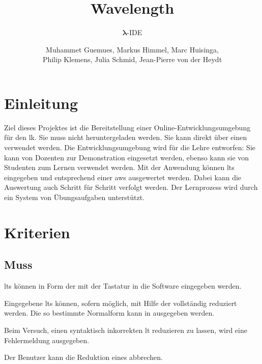 \documentclass[parskip=full,11pt,twoside]{scrartcl}
\title{Wavelength}
\subtitle{$\bm{\lambda}$-IDE}
\author{Muhammet Guemues, Markus Himmel, Marc Huisinga,\\Philip Klemens, Julia Schmid, Jean-Pierre von der Heydt}
\begin{document}
\maketitle
\thispagestyle{empty}
\pagebreak

\tableofcontents
\pagebreak

\section{Einleitung}
Ziel dieses Projektes ist die Bereitstellung einer Online-Entwicklungsumgebung für den \gls{lk}. 
Sie muss nicht heruntergeladen werden.
Sie kann direkt über einen  verwendet werden.
Die Entwicklungsumgebung wird für die Lehre entworfen: 
Sie kann von Dozenten zur Demonstration eingesetzt werden, ebenso kann sie von Studenten zum Lernen verwendet werden.
Mit der Anwendung können \glspl{lt} eingegeben und entsprechend einer \gls{aws} ausgewertet werden.
Dabei kann die Auswertung auch Schritt für Schritt verfolgt werden.
Der Lernprozess wird durch ein System von Übungsaufgaben unterstützt.

\pagebreak
\section{Kriterien}

\subsection{Muss}

\glspl{lt} können in Form der 
mit der Tastatur in die Software eingegeben werden.

Eingegebene \glspl{lt} können, sofern möglich, mit Hilfe der  vollständig
reduziert werden. Die so bestimmte Normalform kann in 
ausgegeben werden.

Beim Versuch, einen syntaktisch inkorrekten \gls{lt} reduzieren zu lassen, wird eine
Fehlermeldung ausgegeben.

Der Benutzer kann die Reduktion eines  abbrechen.
\end{document}

